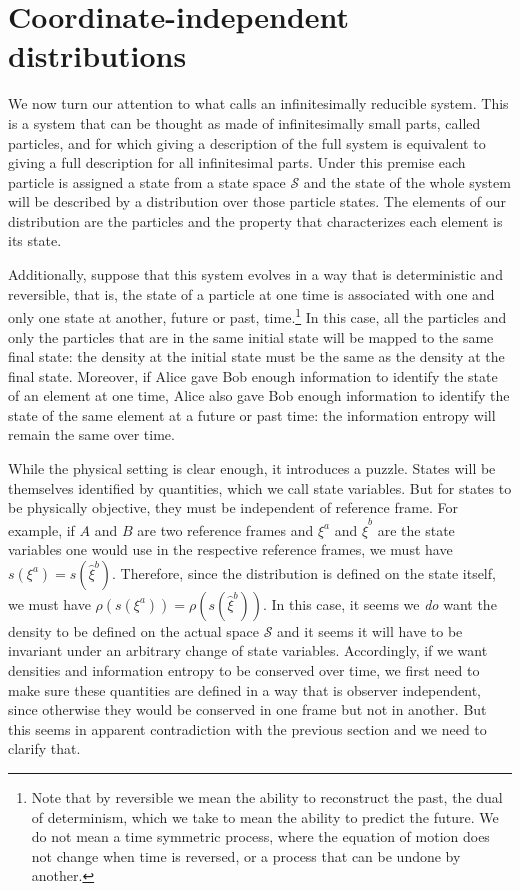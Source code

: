 \documentclass[11pt]{article}
\begin{document}
\section{Coordinate-independent distributions}

We now turn our attention to what \cite{AoPPhy1} calls an infinitesimally reducible system. This is a system that can be thought as made of infinitesimally small parts, called particles, and for which giving a description of the full system is equivalent to giving a full description for all infinitesimal parts. Under this premise each particle is assigned a state from a state space $\mathcal{S}$ and the state of the whole system will be described by a distribution over those particle states. The elements of our distribution are the particles and the property that characterizes each element is its state.

Additionally, suppose that this system evolves in a way that is deterministic and reversible, that is, the state of a particle at one time is associated with one and only one state at another, future or past, time.\footnote{Note that by reversible we mean the ability to reconstruct the past, the dual of determinism, which we take to mean the ability to predict the future. We do not mean a time symmetric process, where the equation of motion does not change when time is reversed, or a process that can be undone by another.} In this case, all the particles and only the particles that are in the same initial state will be mapped to the same final state: the density at the initial state must be the same as the density at the final state. Moreover, if Alice gave Bob enough information to identify the state of an element at one time, Alice also gave Bob enough information to identify the state of the same element at a future or past time: the information entropy will remain the same over time.

While the physical setting is clear enough, it introduces a puzzle. States will be themselves identified by quantities, which we call state variables. But for states to be physically objective, they must be independent of reference frame. For example, if $A$ and $B$ are two reference frames and $\xi^a$ and $\hat{\xi}^b$ are the state variables one would use in the respective reference frames, we must have $s(\xi^a) = s(\hat{\xi}^b)$.  Therefore, since the distribution is defined on the state itself, we must have $\rho(s(\xi^a))=\rho(s(\hat{\xi}^b))$. In this case, it seems we \emph{do} want the density to be defined on the actual space $\mathcal{S}$ and it seems it will have to be invariant under an arbitrary change of state variables. Accordingly, if we want densities and information entropy to be conserved over time, we first need to make sure these quantities are defined in a way that is observer independent, since otherwise they would be conserved in one frame but not in another. But this seems in apparent contradiction with the previous section and we need to clarify that.
\end{document}
